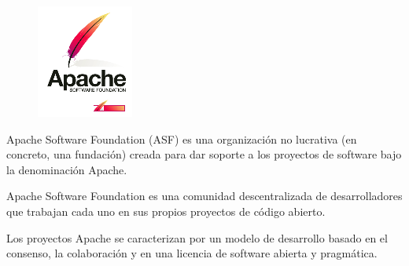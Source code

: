 \begin{figure}
	\includegraphics[scale=.6]{img/apache-logo.png}
\end{figure}

Apache Software Foundation (ASF) es una organización no lucrativa (en concreto, una fundación) creada para dar soporte a los proyectos de software bajo la denominación Apache.

Apache Software Foundation es una comunidad descentralizada de desarrolladores que trabajan cada uno en sus propios proyectos de código abierto. 

Los proyectos Apache se caracterizan por un modelo de desarrollo basado en el consenso, la colaboración y en una licencia de software abierta y pragmática.